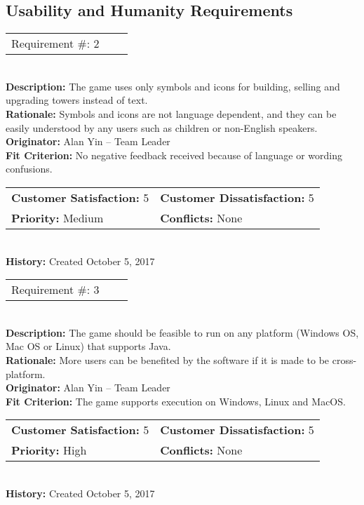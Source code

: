 \documentclass[12pt]{article}
\begin{document}
\subsection{Usability and Humanity Requirements}
\begin{reqbox}
\begin{tabular}{ccc}Requirement \#: 2
\end{tabular} \\
\textbf{Description:} The game uses only symbols and icons for building, selling and upgrading towers instead of text.\\
\textbf{Rationale:} Symbols and icons are not language dependent, and they can be easily understood by any users such as children or non-English speakers.\\
\textbf{Originator:} Alan Yin -- Team Leader \\
\textbf{Fit Criterion:} No negative feedback received because of language or wording confusions.\\
\begin{tabular}{ll}
\textbf{Customer Satisfaction:} 5 & \textbf{Customer Dissatisfaction:} 5 \\
\textbf{Priority:} Medium & \textbf{Conflicts:} None\\
\end{tabular} \\
\textbf{History:} Created October 5, 2017
\end{reqbox}


\newpage
\begin{reqbox}
\begin{tabular}{ccc}Requirement \#: 3
\end{tabular} \\
\textbf{Description:} The game should be feasible to run on any platform (Windows OS, Mac OS or Linux) that supports Java.\\
\textbf{Rationale:} More users can be benefited by the software if it is made to be cross-platform.\\
\textbf{Originator:} Alan Yin -- Team Leader \\
\textbf{Fit Criterion:} The game supports execution on Windows, Linux and MacOS.\\
\begin{tabular}{ll}
\textbf{Customer Satisfaction:} 5 & \textbf{Customer Dissatisfaction:} 5 \\
\textbf{Priority:} High & \textbf{Conflicts:} None\\
\end{tabular} \\
\textbf{History:} Created October 5, 2017
\end{reqbox}
\end{document}
